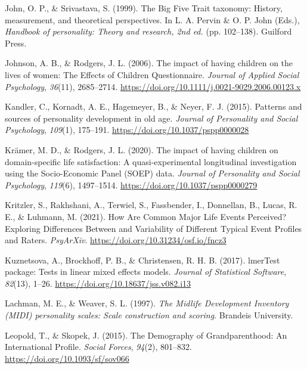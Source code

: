 \documentclass[
  english,
  man, noextraspace,floatsintext]{apa7}
\begin{document}
\leavevmode\hypertarget{ref-johnBigFiveTrait1999}{}%
John, O. P., \& Srivastava, S. (1999). The Big Five Trait taxonomy: History, measurement, and theoretical perspectives. In L. A. Pervin \& O. P. John (Eds.), \emph{Handbook of personality: Theory and research, 2nd ed.} (pp. 102--138). Guilford Press.

\leavevmode\hypertarget{ref-johnsonImpactHavingChildren2006}{}%
Johnson, A. B., \& Rodgers, J. L. (2006). The impact of having children on the lives of women: The Effects of Children Questionnaire. \emph{Journal of Applied Social Psychology}, \emph{36}(11), 2685--2714. \url{https://doi.org/10.1111/j.0021-9029.2006.00123.x}

\leavevmode\hypertarget{ref-kandlerPatternsSourcesPersonality2015a}{}%
Kandler, C., Kornadt, A. E., Hagemeyer, B., \& Neyer, F. J. (2015). Patterns and sources of personality development in old age. \emph{Journal of Personality and Social Psychology}, \emph{109}(1), 175--191. \url{https://doi.org/10.1037/pspp0000028}

\leavevmode\hypertarget{ref-kramerImpactHavingChildren2020}{}%
Krämer, M. D., \& Rodgers, J. L. (2020). The impact of having children on domain-specific life satisfaction: A quasi-experimental longitudinal investigation using the Socio-Economic Panel (SOEP) data. \emph{Journal of Personality and Social Psychology}, \emph{119}(6), 1497--1514. \url{https://doi.org/10.1037/pspp0000279}

\leavevmode\hypertarget{ref-kritzlerHowAreCommon2021}{}%
Kritzler, S., Rakhshani, A., Terwiel, S., Fassbender, I., Donnellan, B., Lucas, R. E., \& Luhmann, M. (2021). How Are Common Major Life Events Perceived? Exploring Differences Between and Variability of Different Typical Event Profiles and Raters. \emph{PsyArXiv}. \url{https://doi.org/10.31234/osf.io/fncz3}

\leavevmode\hypertarget{ref-R-lmerTest}{}%
Kuznetsova, A., Brockhoff, P. B., \& Christensen, R. H. B. (2017). lmerTest package: Tests in linear mixed effects models. \emph{Journal of Statistical Software}, \emph{82}(13), 1--26. \url{https://doi.org/10.18637/jss.v082.i13}

\leavevmode\hypertarget{ref-lachmanMidlifeDevelopmentInventory1997}{}%
Lachman, M. E., \& Weaver, S. L. (1997). \emph{The Midlife Development Inventory (MIDI) personality scales: Scale construction and scoring}. Brandeis University.

\leavevmode\hypertarget{ref-leopoldDemographyGrandparenthoodInternational2015}{}%
Leopold, T., \& Skopek, J. (2015). The Demography of Grandparenthood: An International Profile. \emph{Social Forces}, \emph{94}(2), 801--832. \url{https://doi.org/10.1093/sf/sov066}
\end{document}
